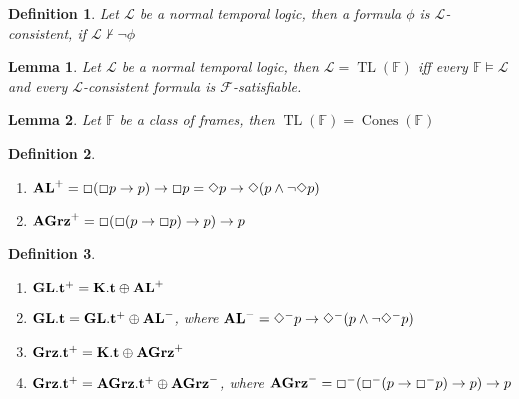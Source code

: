 \documentclass[a4paper]{article}
\theoremstyle{defin}
\newtheorem{defin}{Definition}
\theoremstyle{theorem}
\theoremstyle{prop}
\theoremstyle{lemma}
\newtheorem{lemma}{Lemma}
\theoremstyle{ex}
\theoremstyle{col}
\newcommand{\BoxM}{\Box^{-}}
\newcommand{\DiamondM}{\Diamond^{-}}
\begin{document}
\begin{defin}
  Let $\mathcal{L}$ be a normal temporal logic, then a formula $\phi$ is $\mathcal{L}$-consistent, if $\mathcal{L} \nvdash \neg \phi$
\end{defin}

\begin{lemma}
  Let $\mathcal{L}$ be a normal temporal logic, then $\mathcal{L} = \operatorname{TL}(\mathbb{F})$ iff every $\mathbb{F} \models \mathcal{L}$ and every $\mathcal{L}$-consistent formula is $\mathcal{F}$-satisfiable.
\end{lemma}

\begin{lemma}
  Let $\mathbb{F}$ be a class of frames, then $\operatorname{TL}(\mathbb{F}) = \operatorname{Cones}(\mathbb{F})$
\end{lemma}

\begin{defin}
$ $

  \begin{enumerate}
    \item ${\bf AL}^{+} = \Box (\Box p \to p) \to \Box p = \Diamond p \to \Diamond (p \land \neg \Diamond p)$
    \item ${\bf AGrz}^{+} = \Box (\Box (p \to \Box p) \to p) \to p$
  \end{enumerate}
\end{defin}

\begin{defin}
$ $

  \begin{enumerate}
    \item ${\bf GL}.{\bf t}^{+} = {\bf K}.{\bf t} \oplus {\bf AL}^{+}$
    \item ${\bf GL}.{\bf t} = {\bf GL}.{\bf t}^{+} \oplus {\bf AL}^{-}$, where ${\bf AL}^{-} = \DiamondM p \to \DiamondM (p \land \neg \DiamondM p)$
    \item ${\bf Grz}.{\bf t}^{+} = {\bf K}.{\bf t} \oplus {\bf AGrz}^{+}$
    \item ${\bf Grz}.{\bf t}^{+} = {\bf AGrz}.{\bf t}^{+} \oplus {\bf AGrz}^{-}$, where ${\bf AGrz}^{-} = \BoxM (\BoxM (p \to \BoxM p) \to p) \to p$
  \end{enumerate}
\end{defin}
\end{document}
